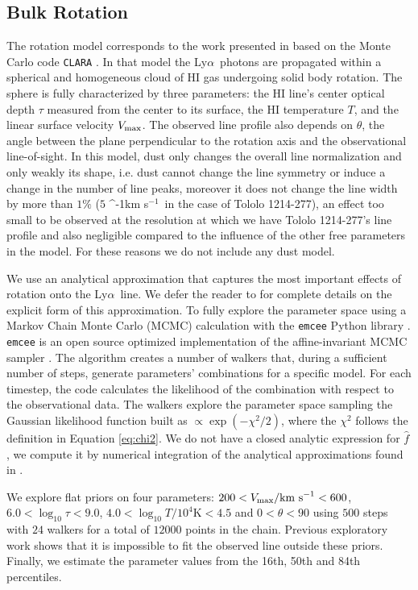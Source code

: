 \documentclass[a4,useAMS,usenatbib,usegraphicx]{mn2e}
\newcommand{\tol}{Tololo 1214-277}
\newcommand{\lya}{\ifmmode{{\rm Ly}\alpha}\else Ly$\alpha$\ \fi}
\newcommand{\kms}{\ifmmode\mathrm{km\ s}^{-1}\else km s$^{-1}$\fi}
\begin{document}
\subsection{Bulk Rotation}

The rotation model corresponds to the work presented in
\citep{GaravitoCamargo2014} based on the Monte Carlo code
\texttt{CLARA} \citep{CLARA}. 
In that model the \lya photons are propagated 
within a spherical and homogeneous cloud of HI gas undergoing solid
body rotation.
The sphere is fully characterized by three parameters: the HI line's
center optical  depth $\tau$ measured from the center to its surface, the HI
temperature $T$, and the linear surface velocity $V_{\rm max}$.  
The observed line profile also depends on $\theta$,  the angle between the plane
perpendicular to the rotation axis and the observational
line-of-sight.  
In this model, dust only changes the overall line
normalization and only weakly its shape, i.e. 
dust cannot change the line symmetry or induce a change in the number
of line peaks, moreover it does not change the line width by more than
$1\%$ ($5$ \kms\ in the case of \tol), an effect too small to be
observed at the resolution at which we have \tol's line profile and
also negligible compared to the influence of the other free parameters in the model.
For these reasons we do not include any dust model. 

We use an analytical approximation that captures the most important
effects of rotation onto the \lya line. 
We defer the reader to \citet{GaravitoCamargo2014} for complete
details on the explicit form of this approximation.
To fully explore the
parameter space using a Markov Chain Monte Carlo (MCMC) calculation with the
\texttt{emcee} Python library \citep{2013PASP..125..306F}. \texttt{emcee} 
is an open source optimized implementation of the affine-invariant 
MCMC sampler \citep{goodman2010ensemble}. 
The algorithm creates a number of walkers that,
during a sufficient number of steps, generate parameters' combinations
for a specific model.
For each timestep, the code calculates the likelihood of the
combination with respect to the observational data.
The walkers explore the parameter space sampling the Gaussian likelihood
function built as $\propto \exp(-\chi^2/2)$, where the $\chi^2$ follows
the definition in Equation \ref{eq:chi2}. 
We do not have a closed analytic expression for $\hat{f}$, we compute it
by numerical integration of the analytical approximations found in
\citet{GaravitoCamargo2014}.  

We explore flat priors on four parameters: $200<V_{\rm
  max}/\mathrm{km\ s}^{-1} <600$,   $6.0<\log_{10}\tau<9.0$,
$4.0<\log_{10} T/10^4\mathrm{K}< 4.5$ and $0<\theta<90$ using $500$
steps with $24$ walkers for a total of $12000$ points in the chain.
Previous exploratory work shows that it is impossible to fit the
observed line outside these priors.
Finally, we estimate the parameter values from the 16th, 50th and 84th
percentiles. 
\end{document}
